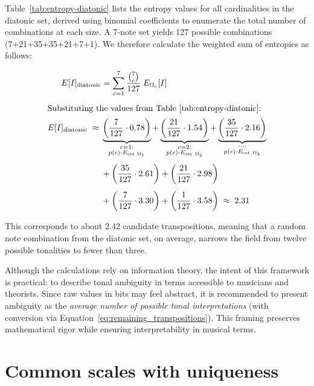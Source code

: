 \documentclass[10pt,twocolumn]{article}
\numberwithin{equation}{section} %
\begin{document}
    Table~\ref{tab:entropy-diatonic} lists the entropy values for all cardinalities in the diatonic set, derived using binomial coefficients to enumerate the total number of combinations at each size.
    A 7‑note set yields 127 possible combinations (7+21+35+35+21+7+1).
    We therefore calculate the weighted sum of entropies as follows:

    \begin{align}
        E[I]_{\text{diatonic}} &= \sum_{c=1}^{7} \frac{\binom{7}{c}}{127} \; E_{\Omega_c}[I]
        \label{eq:diatonic-avg} \\[4pt]
        \intertext{Substituting the values from Table~\ref{tab:entropy-diatonic}:}
        E[I]_{\text{diatonic}} \;\approx\; &
        \underbrace{\left( \frac{7}{127} \cdot 0.78 \right)}_{\substack{c=1:\\ p(c)\cdot E_{\text{set}~\Omega_1}}} +
        \underbrace{\left( \frac{21}{127} \cdot 1.54 \right)}_{\substack{c=2:\\ p(c)\cdot E_{\text{set}~\Omega_2}}} +
        \underbrace{\left( \frac{35}{127} \cdot 2.16 \right)}_{\substack{\dots:\\ p(c)\cdot E_{\text{set}~\Omega_3}}}
        \notag \\[4pt]
        &+ \left( \frac{35}{127} \cdot 2.61 \right) +
        \left( \frac{21}{127} \cdot 2.98 \right)
        \notag \\[4pt]
        &+ \left( \frac{7}{127} \cdot 3.30 \right) +
        \left( \frac{1}{127} \cdot 3.58 \right)
        \;\approx\; 2.31
        \label{eq:diatonic-sub}
    \end{align}

    

    This corresponds to about 2.42 candidate transpositions, meaning that a random note combination from the diatonic set, on average, narrows the field from twelve possible tonalities to fewer than three.

    Although the calculations rely on information theory, the intent of this framework is practical: to describe tonal ambiguity in terms accessible to musicians and theorists.
    Since raw values in bits may feel abstract, it is recommended to present ambiguity as the \textit{average number of possible tonal interpretations} (with conversion via Equation~\ref{eq:remaining_transpositions}).
    This framing preserves mathematical rigor while ensuring interpretability in musical terms.

    \section{Common scales with uniqueness}
\end{document}
